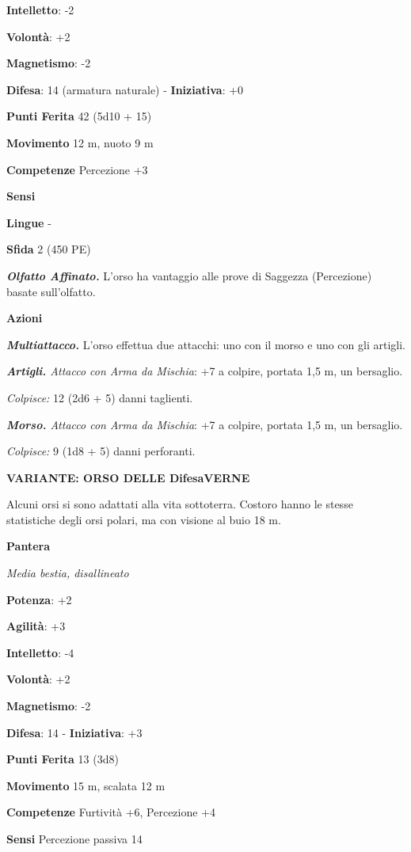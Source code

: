 \begin{multicols}{2}
\textbf{Intelletto}: -2

\textbf{Volontà}: +2

\textbf{Magnetismo}: -2

\textbf{Difesa}: 14 (armatura naturale) - \textbf{Iniziativa}: +0

\textbf{Punti Ferita} 42 (5d10 + 15)

\textbf{Movimento} 12 m, nuoto 9 m

\textbf{Competenze} Percezione +3

\textbf{Sensi} 

\textbf{Lingue} -

\textbf{Sfida} 2 (450 PE)

\emph{\textbf{Olfatto Affinato.}} L'orso ha vantaggio alle prove di
Saggezza (Percezione) basate sull'olfatto.

\textbf{Azioni}

\emph{\textbf{Multiattacco.}} L'orso effettua due attacchi: uno con il
morso e uno con gli artigli.

\emph{\textbf{Artigli.} Attacco con Arma da Mischia}: +7 a colpire,
portata 1,5 m, un bersaglio.

\emph{Colpisce:} 12 (2d6 + 5) danni taglienti.

\emph{\textbf{Morso.} Attacco con Arma da Mischia}: +7 a colpire,
portata 1,5 m, un bersaglio.

\emph{Colpisce:} 9 (1d8 + 5) danni perforanti.

\textbf{VARIANTE: ORSO DELLE DifesaVERNE}

Alcuni orsi si sono adattati alla vita sottoterra. Costoro hanno le
stesse statistiche degli orsi polari, ma con visione al buio 18 m.

\textbf{Pantera}

\emph{Media bestia, disallineato}

\textbf{Potenza}: +2

\textbf{Agilità}: +3

\textbf{Intelletto}: -4

\textbf{Volontà}: +2

\textbf{Magnetismo}: -2

\textbf{Difesa}: 14 - \textbf{Iniziativa}: +3

\textbf{Punti Ferita} 13 (3d8)

\textbf{Movimento} 15 m, scalata 12 m

\textbf{Competenze} Furtività +6, Percezione +4

\textbf{Sensi} Percezione passiva 14


\end{multicols}
